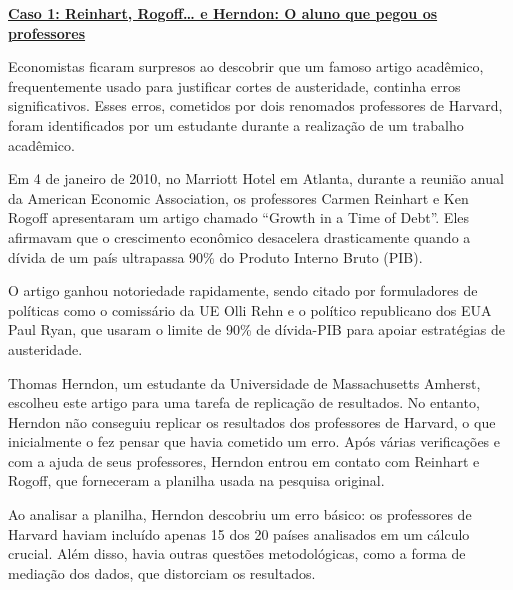 \documentclass[
  a4paper,
]{article}
\begin{document}
\begin{tcolorbox}[enhanced jigsaw, breakable, opacityback=0, left=2mm, colbacktitle=quarto-callout-warning-color!10!white, colframe=quarto-callout-warning-color-frame, coltitle=black, title=\textcolor{quarto-callout-warning-color}{\faExclamationTriangle}\hspace{0.5em}{Você não vai querer cometer esses erros\footnote{Pedi para o ChatGPT4o
  resumir as duas matérias e me dar sua resposta em português. Como
  sempre, revisei o conteúdo para saber se batia com o que eu li.}}, titlerule=0mm, leftrule=.75mm, arc=.35mm, colback=white, bottomtitle=1mm, toptitle=1mm, toprule=.15mm, bottomrule=.15mm, rightrule=.15mm, opacitybacktitle=0.6]

\href{https://www.bbc.com/news/magazine-22223190}{\textbf{Caso 1:
Reinhart, Rogoff\ldots{} e Herndon: O aluno que pegou os professores}}

Economistas ficaram surpresos ao descobrir que um famoso artigo
acadêmico, frequentemente usado para justificar cortes de austeridade,
continha erros significativos. Esses erros, cometidos por dois renomados
professores de Harvard, foram identificados por um estudante durante a
realização de um trabalho acadêmico.

Em 4 de janeiro de 2010, no Marriott Hotel em Atlanta, durante a reunião
anual da American Economic Association, os professores Carmen Reinhart e
Ken Rogoff apresentaram um artigo chamado ``Growth in a Time of Debt''.
Eles afirmavam que o crescimento econômico desacelera drasticamente
quando a dívida de um país ultrapassa 90\% do Produto Interno Bruto
(PIB).

O artigo ganhou notoriedade rapidamente, sendo citado por formuladores
de políticas como o comissário da UE Olli Rehn e o político republicano
dos EUA Paul Ryan, que usaram o limite de 90\% de dívida-PIB para apoiar
estratégias de austeridade.

Thomas Herndon, um estudante da Universidade de Massachusetts Amherst,
escolheu este artigo para uma tarefa de replicação de resultados. No
entanto, Herndon não conseguiu replicar os resultados dos professores de
Harvard, o que inicialmente o fez pensar que havia cometido um erro.
Após várias verificações e com a ajuda de seus professores, Herndon
entrou em contato com Reinhart e Rogoff, que forneceram a planilha usada
na pesquisa original.

Ao analisar a planilha, Herndon descobriu um erro básico: os professores
de Harvard haviam incluído apenas 15 dos 20 países analisados em um
cálculo crucial. Além disso, havia outras questões metodológicas, como a
forma de mediação dos dados, que distorciam os resultados.


\end{tcolorbox}
\end{document}
